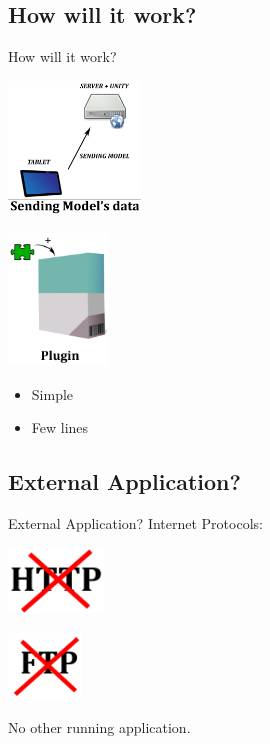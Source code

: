 \documentclass[a4paper,10pt]{beamer}
\begin{document}
		\subsection{How will it work?}
			
			\begin{frame}{How will it work?}
				\begin{multicols}{2}
					\includegraphics[height=100pt]{images/network/sending_model.png}
					\pause
					
					\columnbreak
					\includegraphics[height=100pt]{images/network/plugin.png}
					\begin{itemize}
						\item Simple
						\item Few lines
					\end{itemize}
				\end{multicols}
				
			\end{frame}
			
		\subsection{External Application?}
			
			\begin{frame}{External Application?}
				Internet Protocols:
				
				\begin{multicols}{2}
					\includegraphics[height=50pt]{images/network/nohttp.png}
					
					\columnbreak
					\includegraphics[height=50pt]{images/network/noftp.png}
				\end{multicols}
				
				\pause
				
				No other running application.
			\end{frame}
			
\end{document}

